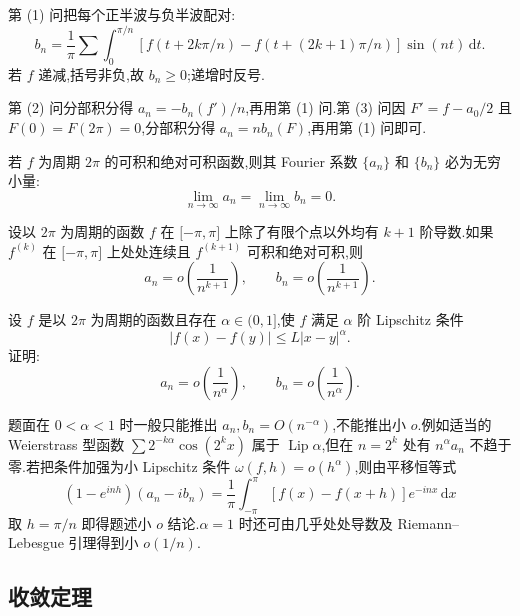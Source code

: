 \begin{solution}
    第 (1) 问把每个正半波与负半波配对:
    \[
        b_n=\dfrac{1}{\pi}\sum\int_0^{\pi/n}
        [f(t+2k\pi/n)-f(t+(2k+1)\pi/n)]\sin(nt)\,\mathrm{d}t.
    \]
    若 $f$ 递减,括号非负,故 $b_n\geq0$;递增时反号.

    第 (2) 问分部积分得 $a_n=-b_n(f')/n$,再用第 (1) 问.第 (3) 问因
    $F'=f-a_0/2$ 且 $F(0)=F(2\pi)=0$,分部积分得 $a_n=nb_n(F)$,再用第 (1) 问即可.
\end{solution}

\begin{proposition}[\markstar]
    若 $f$ 为周期 $2\pi$ 的可积和绝对可积函数,则其 Fourier 系数 $\{a_n\}$ 和 $\{b_n\}$ 必为无穷小量:
    \[
        \lim\limits_{n\to\infty}a_n=\lim\limits_{n\to\infty}b_n=0.
    \]
\end{proposition}

\begin{proposition}[\markstar]
    设以 $2\pi$ 为周期的函数 $f$ 在 $\lbrack -\pi,\pi\rbrack$ 上除了有限个点以外均有 $k+1$ 阶导数.如果 $f^{(k)}$ 在 $\lbrack -\pi,\pi\rbrack$ 上处处连续且 $f^{(k+1)}$ 可积和绝对可积,则
    \[
        a_n=o\left(\dfrac{1}{n^{k+1}}\right),
        \qquad
        b_n=o\left(\dfrac{1}{n^{k+1}}\right).
    \]
\end{proposition}

\begin{example}
    设 $f$ 是以 $2\pi$ 为周期的函数且存在 $\alpha\in(0,1\rbrack$,使 $f$ 满足 $\alpha$ 阶 Lipschitz 条件
    \[
        |f(x)-f(y)|\leq L|x-y|^\alpha.
    \]
    证明:
    \[
        a_n=o\left(\dfrac{1}{n^\alpha}\right),
        \qquad
        b_n=o\left(\dfrac{1}{n^\alpha}\right).
    \]
\end{example}
\exampleblank

\begin{solution}
    题面在 $0<\alpha<1$ 时一般只能推出
    $a_n,b_n=O(n^{-\alpha})$,不能推出小 $o$.例如适当的 Weierstrass 型函数
    $\sum 2^{-k\alpha}\cos(2^kx)$ 属于 $\operatorname{Lip}\alpha$,但在 $n=2^k$ 处有
    $n^\alpha a_n$ 不趋于零.若把条件加强为小 Lipschitz 条件
    $\omega(f,h)=o(h^\alpha)$,则由平移恒等式
    \[
        (1-e^{inh})(a_n-ib_n)=\dfrac{1}{\pi}\int_{-\pi}^{\pi}[f(x)-f(x+h)]e^{-inx}\,\mathrm{d}x
    \]
    取 $h=\pi/n$ 即得题述小 $o$ 结论.$\alpha=1$ 时还可由几乎处处导数及 Riemann--Lebesgue 引理得到小 $o(1/n)$.
\end{solution}



\subsection{收敛定理}

